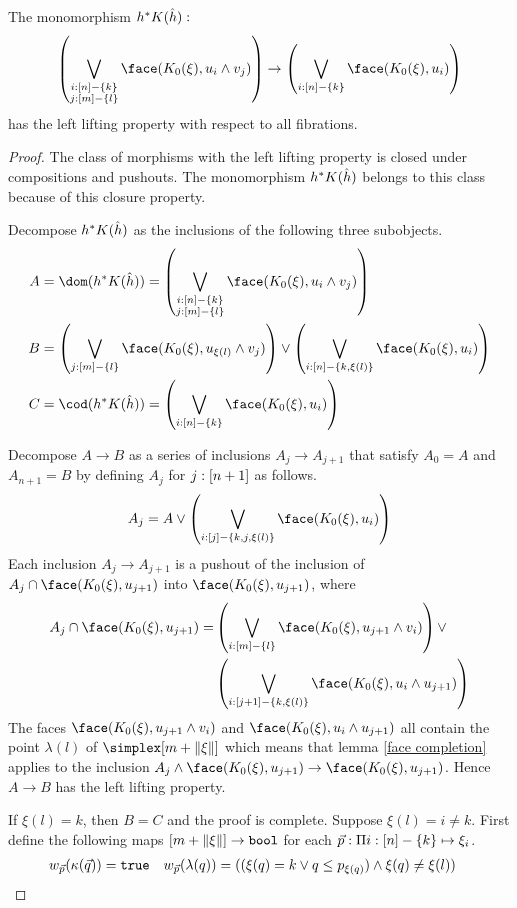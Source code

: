 \documentclass[csh.tex]{subfiles}
\begin{document}
\begin{lemma} The monomorphism $h^* K(\hat h):$
\[ \left(\bigvee_{\substack{i\of[n]-\set{k}\\j\of [m]-\set l}}\face(K_0(\xi),u_i\land v_j)\right)\to\left(\bigvee_{i\of[n]-\set{k}} \face(K_0(\xi),u_i)\right) \] 
has the left lifting property with respect to all fibrations.\label{left lifting property}\end{lemma}

\begin{proof}The class of morphisms with the left lifting property is closed under compositions and pushouts. The monomorphism $h^* K(\hat h)$ belongs to this class because of this closure property.

Decompose $h^* K(\hat h)$ as the inclusions of the following three subobjects.
\begin{align*}
A &=\dom(h\ri K(\hat h))=\left(\bigvee_{\substack{i\of[n]-\set{k}\\j\of [m]-\set l}}\face(K_0(\xi),u_i\land v_j)\right)\\
B &=\left(\bigvee_{j\of[m]-\set l}\face(K_0(\xi),u_{\xi(l)}\land v_j)\right)\vee \left(\bigvee_{i\of[n]-\set{k,\xi(l)}}\face(K_0(\xi),u_i)\right)\\
C &=\cod(h\ri K(\hat h))=\left(\bigvee_{i\of[n]-\set{k}} \face(K_0(\xi),u_i)\right)
\end{align*}

Decompose $A\to B$ as a series of inclusions $A_j\to A_{j+1}$ that satisfy $A_0=A$ and $A_{n+1}=B$ by defining $A_j$ for $j:[n+1]$ as follows.
\[ A_j = A\vee \left(\bigvee_{i\of[j]-\set{k,j,\xi(l)}}\face(K_0(\xi),u_i)\right) \]
Each inclusion $A_j\to A_{j+1}$ is a pushout of the inclusion of $A_j\cap \face(K_0(\xi),u_{j+1})$ into $\face(K_0(\xi),u_{j+1})$, where
\begin{align*} A_j\cap \face(K_0(\xi),u_{j+1}) = &\left(\bigvee_{i\of[m]-\set l}\face(K_0(\xi),u_{j+1}\land v_{i})\right)\vee \\
&\left(\bigvee_{i\of[j+1]-\set{k,\xi(l)}}\face(K_0(\xi),u_i\land u_{j+1})\right)\end{align*}
The faces $\face(K_0(\xi),u_{j+1}\land v_{i})$ and $\face(K_0(\xi),u_i\land u_{j+1})$ all contain the point $\lambda(l)$ of $\simplex[m+\norm\xi]$ which means that lemma \ref{face completion} applies to the inclusion $A_j\land \face(K_0(\xi),u_{j+1}) \to \face(K_0(\xi),u_{j+1})$. Hence $A\to B$ has the left lifting property.

If $\xi(l)=k$, then $B=C$ and the proof is complete. Suppose $\xi(l)=i\neq k$. First define the following maps $[m+\Vert \xi \Vert]\to\mathtt{bool}$ for each $\vec p :\Pi i: [n]-\left\{k\right\} \mapsto{\xi_i}$.
\begin{align*}
w_{\vec p}(\kappa(\vec q)) &= \mathtt{true} &
w_{\vec p}(\lambda(q)) &= ((\xi(q)=k\vee q\leq p_{\xi(q)})\land\xi(q)\neq \xi(l))
\end{align*}


\end{proof}
\end{document}
